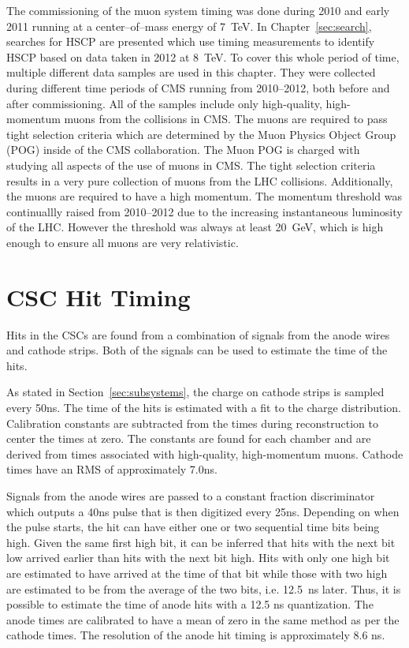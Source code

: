 The commissioning of the muon system timing was done during 2010 and early 2011 running at a center--of--mass energy of 7~TeV.
In Chapter~\ref{sec:search}, searches for HSCP are presented which use
timing measurements to identify HSCP based on data taken in 2012 at 8~TeV.
To cover this whole period of time,
multiple different data samples are used in this chapter. They were collected during different time periods of CMS running from 2010--2012, both before and after commissioning.
All of the samples include only high-quality, high-momentum muons from the collisions in CMS.
The muons are required to pass tight selection criteria which are determined by the Muon Physics Object Group (POG) inside of the CMS collaboration.
The Muon POG is charged with studying all aspects of the use of muons in CMS.
The tight selection criteria results in a very pure collection of muons from the LHC collisions.
Additionally, the muons are required to have a high momentum. The momentum threshold was continuallly raised from 2010--2012 due to the increasing instantaneous luminosity
of the LHC. However the threshold was always at least 20~GeV, which is high enough to ensure all muons are very relativistic.

\section{CSC Hit Timing}
Hits in the CSCs are found from a combination of signals from the anode wires and cathode strips. Both of the signals can be used to estimate the time of the hits.

As stated in Section~\ref{sec:subsystems}, the charge on cathode strips is sampled every 50ns.
The time of the hits is estimated with a fit to the charge distribution. Calibration constants are subtracted from the times during reconstruction to center the times at zero.
The constants are found for each chamber and are derived from times associated with high-quality, high-momentum muons. Cathode times have an RMS of approximately 7.0ns.

Signals from the anode wires are passed to a constant fraction discriminator which outputs a 40ns pulse
that is then digitized every 25ns. Depending on when the pulse starts, the hit can have either one or two sequential time bits being high. Given the same
first high bit, it can be inferred that hits with the next bit low arrived earlier than hits with the next bit high.
Hits with only one high bit are estimated to have arrived at the time of that bit while those with two high are estimated to be from the average of the two bits, i.e. 12.5~ns
later.
Thus, it is possible to estimate the time of anode hits with a 12.5 ns quantization. The anode times are calibrated to have a mean of zero in the same method as
per the cathode times. The resolution of the anode hit timing is approximately 8.6 ns.


